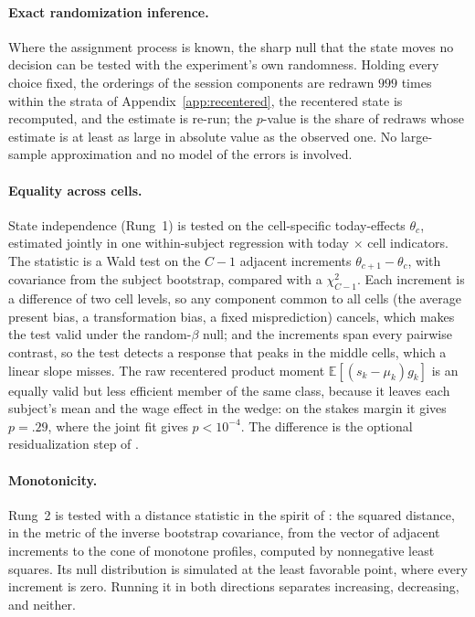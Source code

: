 \documentclass[11pt,a4paper]{article}
\theoremstyle{plain}
\theoremstyle{definition}
\newcommand{\E}{\mathbb{E}}
\begin{document}
\paragraph{Exact randomization inference.} Where the assignment process is known, the sharp null that the state moves
no decision can be tested with the experiment's own randomness. Holding every choice fixed, the orderings of the
session components are redrawn $999$ times within the strata of Appendix~\ref{app:recentered}, the recentered state is
recomputed, and the estimate is re-run; the $p$-value is the share of redraws whose estimate is at least as large in
absolute value as the observed one. No large-sample approximation and no model of the errors is involved.

\paragraph{Equality across cells.} State independence (Rung~1) is tested on the cell-specific today-effects
$\theta_c$, estimated jointly in one within-subject regression with today $\times$ cell indicators. The statistic is a
Wald test on the $C-1$ adjacent increments $\theta_{c+1}-\theta_c$, with covariance from the subject bootstrap,
compared with a $\chi^2_{C-1}$. Each increment is a difference of two cell levels, so any component common to all
cells (the average present bias, a transformation bias, a fixed misprediction) cancels, which makes the test valid
under the random-$\beta$ null; and the increments span every pairwise contrast, so the test detects a response that
peaks in the middle cells, which a linear slope misses. The raw recentered product moment
$\E[(s_k-\mu_k)g_k]$ is an equally valid but less efficient member of the same class, because it leaves each
subject's mean and the wage effect in the wedge: on the stakes margin it gives $p=.29$, where the joint fit gives
$p<10^{-4}$. The difference is the optional residualization step of \citet[Algorithm~1]{borusyakhull2026}.

\paragraph{Monotonicity.} Rung~2 is tested with a distance statistic in the spirit of \citet{wolak1987}: the squared
distance, in the metric of the inverse bootstrap covariance, from the vector of adjacent increments to the cone of
monotone profiles, computed by nonnegative least squares. Its null distribution is simulated at the least favorable
point, where every increment is zero. Running it in both directions separates increasing, decreasing, and neither.
\end{document}
